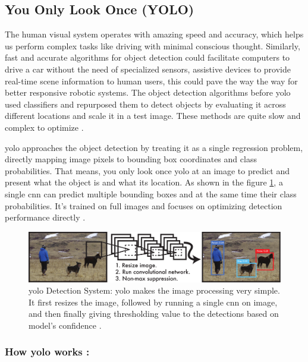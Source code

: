 \subsection{You Only Look Once (YOLO)}
\label{subsec:yolo}

The human visual system operates with amazing speed and accuracy, which helps us perform complex tasks like driving with minimal conscious thought. Similarly, fast and accurate algorithms for object detection could facilitate computers to drive a car without the need of specialized sensors, assistive devices to provide real-time scene information to human users, this could pave the way the way for better responsive robotic systems. The object detection algorithms before \gls{yolo} used classifiers and repurposed them to detect objects by evaluating it across different locations and scale it in a test image. These methods are quite slow and complex to optimize \cite{redmon2016you}.

\gls{yolo} approaches the object detection by treating it as a single regression problem, directly mapping image pixels to bounding box coordinates and class probabilities. That means, you only look once \gls{yolo} at an image to predict and present what the object is and what its location. As shown in the figure \ref{fig:yolo system}, a single \gls{cnn} can predict multiple bounding boxes and at the same time their class probabilities. It's trained on full images and focuses on optimizing detection performance directly \cite{redmon2016you}.

\begin{figure}[H]
    \centering
    \includegraphics[width=1\linewidth]{Rohit_Master_Thesis//Images/yolo_system.pdf}
    \caption{\gls{yolo} Detection System: \gls{yolo} makes the image processing very simple. It first resizes the image, followed by running a single \gls{cnn} on image, and then finally giving thresholding value to the detections based on model's confidence \cite{redmon2016you}.}
    \label{fig:yolo system}
\end{figure}


\subsubsection*{ How \gls{yolo} works :}

